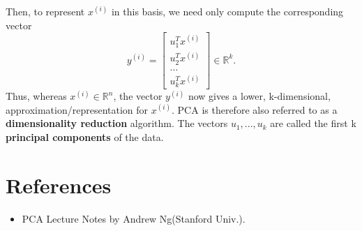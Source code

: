 \documentclass[a4paper]{article}
\begin{document}
Then, to represent $x^{(i)}$ in this basis, we need only compute the corresponding vector
$$
	y^{(i)} = \begin{bmatrix} 
	u_1^Tx^{(i)} \\
	u_2^Tx^{(i)} \\
	... \\
	u_k^Tx^{(i)} \end{bmatrix}
	\in \mathbb{R}^{k}.
$$
Thus, whereas $x^{(i)} \in \mathbb{R}^n$, the vector $y^{(i)}$ now gives a lower, k-dimensional, approximation/representation for $x^{(i)}$. PCA is therefore also referred to as a \textbf{dimensionality reduction} algorithm. The vectors $u_1, ..., u_k$ are called the first k \textbf{principal components} of the data.

\section{References}

\begin{itemize}
    \item PCA Lecture Notes by Andrew Ng(Stanford Univ.).    
\end{itemize}
\end{document}
